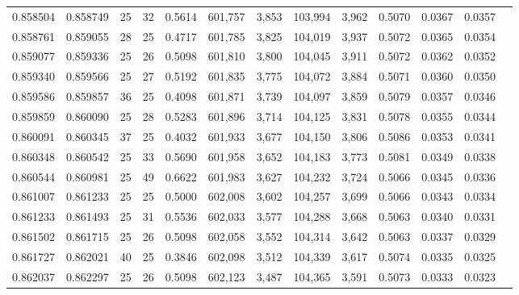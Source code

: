 \begin{tabular}{rrrrrrrrrrrrr}
0.858504 & 0.858749 &    25 &  32 &                                     0.5614 & 601,757 &   3,853 & 103,994 &   3,962 & 0.5070 & 0.0367 & 0.0357 \\
0.858761 & 0.859055 &    28 &  25 &                                     0.4717 & 601,785 &   3,825 & 104,019 &   3,937 & 0.5072 & 0.0365 & 0.0354 \\
0.859077 & 0.859336 &    25 &  26 &                                     0.5098 & 601,810 &   3,800 & 104,045 &   3,911 & 0.5072 & 0.0362 & 0.0352 \\
0.859340 & 0.859566 &    25 &  27 &                                     0.5192 & 601,835 &   3,775 & 104,072 &   3,884 & 0.5071 & 0.0360 & 0.0350 \\
0.859586 & 0.859857 &    36 &  25 &                                     0.4098 & 601,871 &   3,739 & 104,097 &   3,859 & 0.5079 & 0.0357 & 0.0346 \\
0.859859 & 0.860090 &    25 &  28 &                                     0.5283 & 601,896 &   3,714 & 104,125 &   3,831 & 0.5078 & 0.0355 & 0.0344 \\
0.860091 & 0.860345 &    37 &  25 &                                     0.4032 & 601,933 &   3,677 & 104,150 &   3,806 & 0.5086 & 0.0353 & 0.0341 \\
0.860348 & 0.860542 &    25 &  33 &                                     0.5690 & 601,958 &   3,652 & 104,183 &   3,773 & 0.5081 & 0.0349 & 0.0338 \\
0.860544 & 0.860981 &    25 &  49 &                                     0.6622 & 601,983 &   3,627 & 104,232 &   3,724 & 0.5066 & 0.0345 & 0.0336 \\
0.861007 & 0.861233 &    25 &  25 &                                     0.5000 & 602,008 &   3,602 & 104,257 &   3,699 & 0.5066 & 0.0343 & 0.0334 \\
0.861233 & 0.861493 &    25 &  31 &                                     0.5536 & 602,033 &   3,577 & 104,288 &   3,668 & 0.5063 & 0.0340 & 0.0331 \\
0.861502 & 0.861715 &    25 &  26 &                                     0.5098 & 602,058 &   3,552 & 104,314 &   3,642 & 0.5063 & 0.0337 & 0.0329 \\
0.861727 & 0.862021 &    40 &  25 &                                     0.3846 & 602,098 &   3,512 & 104,339 &   3,617 & 0.5074 & 0.0335 & 0.0325 \\
0.862037 & 0.862297 &    25 &  26 &                                     0.5098 & 602,123 &   3,487 & 104,365 &   3,591 & 0.5073 & 0.0333 & 0.0323 \\

\end{tabular}
